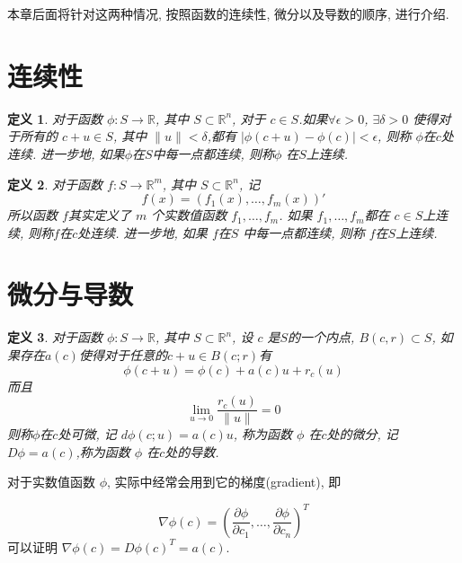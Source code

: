 \documentclass{ctexbook}
\newtheorem{definition}{定义}
\begin{document}
本章后面将针对这两种情况, 按照函数的连续性, 微分以及导数的顺序, 进行介绍.

\section{连续性}
\begin{definition}
	对于函数 $\phi : S \rightarrow \mathbb R$, 其中 $S\subset \mathbb R^n $, 对于 $c \in S$.如果$\forall \epsilon > 0$, $\exists \delta >0$ 使得对于所有的 $c+u\in S$, 其中 $\|u\|< \delta$,都有 $|\phi(c+u) - \phi(c)| < \epsilon$, 则称 $\phi$在$c$处连续. 进一步地, 如果$\phi$在$S$中每一点都连续, 则称$\phi$ 在$S$上连续.
\end{definition}

\begin{definition}
	对于函数 $f : S \rightarrow \mathbb R^m$, 其中 $S\subset \mathbb R^n $, 记
	\begin{equation*}
  f(x) = (f_1(x), \dots, f_m(x))'
\end{equation*}
所以函数 $f$其实定义了 $m$ 个实数值函数 $f_1, \dots, f_m$. 如果 $f_1, \dots, f_m$都在 $c\in S$上连续, 则称$f$在$c$处连续. 进一步地, 如果 $f$在$S$ 中每一点都连续, 则称 $f$在$S$上连续.
\end{definition}

\section{微分与导数}


\begin{definition}\label{def:diff_phi}
	对于函数 $\phi : S \rightarrow \mathbb R$, 其中 $S\subset \mathbb R^n $, 设 $c$ 是$S$的一个内点, $B(c,r)\subset S$, 如果存在$a(c)$使得对于任意的$c+u\in B(c;r)$有
	\begin{equation*}
  \phi(c+u) = \phi(c) + a(c)u + r_c(u)
\end{equation*}
 而且
 \begin{equation*}
  \lim_{u\rightarrow 0} \frac{r_c(u)}{\|u\|} = 0
\end{equation*}
则称$\phi$在$c$处可微,
记 $d\phi(c;u) = a(c)u$, 称为函数 $\phi$ 在$c$处的微分, 记$D\phi = a(c)$,称为函数 $\phi$ 在$c$处的导数.
\end{definition}

对于实数值函数 $\phi$, 实际中经常会用到它的梯度(gradient), 即

\begin{equation*}
  \nabla \phi(c) =  (\frac{\partial \phi}{\partial c_1}, \dots,\frac{\partial \phi}{\partial c_n})^T
\end{equation*}
可以证明 $\nabla \phi(c)= D\phi(c)^T=a(c)$.
\end{document}
